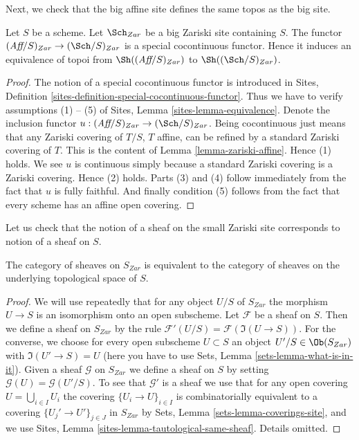 \noindent
Next, we check that the big affine site defines the same
topos as the big site.

\begin{lemma}
\label{lemma-affine-big-site-Zariski}
Let $S$ be a scheme. Let $\Sch_{Zar}$ be a big Zariski
site containing $S$.
The functor $(\textit{Aff}/S)_{Zar} \to (\Sch/S)_{Zar}$
is a special cocontinuous functor. Hence it induces an equivalence
of topoi from $\Sh((\textit{Aff}/S)_{Zar})$ to
$\Sh((\Sch/S)_{Zar})$.
\end{lemma}

\begin{proof}
The notion of a special cocontinuous functor is introduced in
Sites, Definition \ref{sites-definition-special-cocontinuous-functor}.
Thus we have to verify assumptions (1) -- (5) of
Sites, Lemma \ref{sites-lemma-equivalence}.
Denote the inclusion functor
$u : (\textit{Aff}/S)_{Zar} \to (\Sch/S)_{Zar}$.
Being cocontinuous just means that any Zariski covering of
$T/S$, $T$ affine, can be refined by a standard Zariski covering of $T$.
This is the content of
Lemma \ref{lemma-zariski-affine}.
Hence (1) holds. We see $u$ is continuous simply because a standard
Zariski covering is a Zariski covering. Hence (2) holds.
Parts (3) and (4) follow immediately from the fact that $u$ is
fully faithful. And finally condition (5) follows from the
fact that every scheme has an affine open covering.
\end{proof}

\noindent
Let us check that the notion of a sheaf on the small Zariski site
corresponds to notion of a sheaf on $S$.

\begin{lemma}
\label{lemma-Zariski-usual}
The category of sheaves on $S_{Zar}$ is equivalent to the
category of sheaves on the underlying topological space of $S$.
\end{lemma}

\begin{proof}
We will use repeatedly that for any object
$U/S$ of $S_{Zar}$ the morphism $U \to S$ is an isomorphism
onto an open subscheme.
Let $\mathcal{F}$ be a sheaf on $S$. Then we define a sheaf
on $S_{Zar}$ by the rule $\mathcal{F}'(U/S) = \mathcal{F}(\Im(U \to S))$.
For the converse, we choose for every open subscheme $U \subset S$ an object
$U'/S \in \Ob(S_{Zar})$ with $\Im(U' \to S) = U$
(here you have to use Sets, Lemma \ref{sets-lemma-what-is-in-it}).
Given a sheaf $\mathcal{G}$ on $S_{Zar}$ we define a sheaf on $S$ by setting
$\mathcal{G}(U) = \mathcal{G}(U'/S)$. To see that $\mathcal{G}'$ is
a sheaf we use that for any open covering $U = \bigcup_{i \in I} U_i$
the covering $\{U_i \to U\}_{i \in I}$
is combinatorially equivalent to a covering $\{U_j' \to U'\}_{j \in J}$
in $S_{Zar}$ by Sets, Lemma \ref{sets-lemma-coverings-site},
and we use Sites, Lemma \ref{sites-lemma-tautological-same-sheaf}.
Details omitted.
\end{proof}

